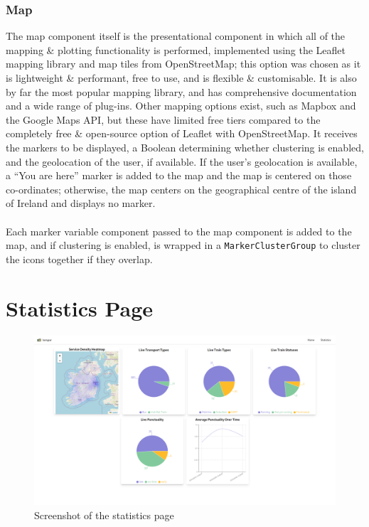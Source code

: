 \documentclass[a4paper,11pt]{report}
\begin{document}
\subsubsection{Map}
The map component itself is the presentational component in which all of the mapping \& plotting functionality is performed, implemented using the Leaflet\supercite{leaflet} mapping library and map tiles from OpenStreetMap\supercite{osm};
this option was chosen as it is lightweight \& performant, free to use, and is flexible \& customisable.
It is also by far the most popular mapping library, and has comprehensive documentation and a wide range of plug-ins.
Other mapping options exist, such as Mapbox\supercite{mapbox} and the Google Maps API\supercite{gmaps}, but these have limited free tiers compared to the completely free \& open-source option of Leaflet with OpenStreetMap.
It receives the markers to be displayed, a Boolean determining whether clustering is enabled, and the geolocation of the user, if available.
If the user's geolocation is available, a ``You are here'' marker is added to the map and the map is centered on those co-ordinates;
otherwise, the map centers on the geographical centre of the island of Ireland\supercite{osi} and displays no marker.
\\\\
Each marker variable component passed to the map component is added to the map, and if clustering is enabled, is wrapped in a \texttt{MarkerClusterGroup} to cluster the icons together if they overlap.

\section{Statistics Page}
\begin{figure}[H]
    \centering
    \includegraphics[width=\textwidth]{./images/statisiticspage.png}
    \caption{Screenshot of the statistics page}
\end{figure}
\end{document}
